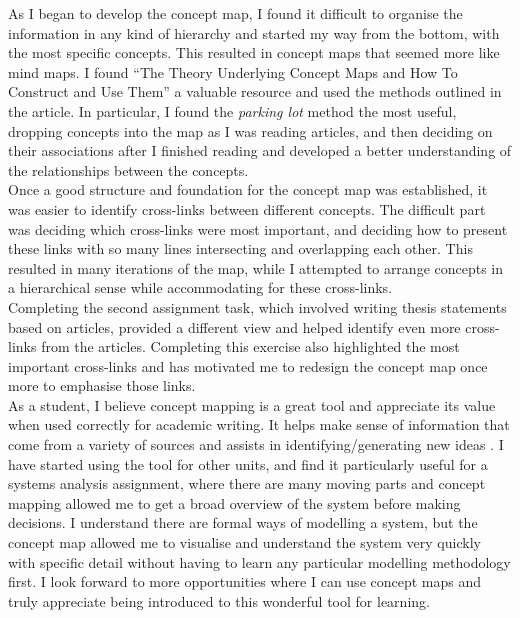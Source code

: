 \documentclass[12pt,a4paper]{report}
\begin{document}
As I began to develop the concept map, I found it difficult to organise the information in any kind of hierarchy and started my way from the bottom, with the most specific concepts. This resulted in concept maps that seemed more like mind maps. I found \citet{Novak2006} ``The Theory Underlying Concept Maps and How To Construct and Use Them'' a valuable resource and used the methods outlined in the article. In particular, I found the \emph{parking lot} method the most useful, dropping concepts into the map as I was reading articles, and then deciding on their associations after I finished reading and developed a better understanding of the relationships between the concepts.\\

Once a good structure and foundation for the concept map was established, it was easier to identify cross-links between different concepts. The difficult part was deciding which cross-links were most important, and deciding how to present these links with so many lines intersecting and overlapping each other. This resulted in many iterations of the map, while I attempted to arrange concepts in a hierarchical sense while accommodating for these cross-links.\\

Completing the second assignment task, which involved writing thesis statements based on articles, provided a different view and helped identify even more cross-links from the articles. Completing this exercise also highlighted the most important cross-links and has motivated me to redesign the concept map once more to emphasise those links.\\

As a student, I believe concept mapping is a great tool and appreciate its value when used correctly for academic writing. It helps make sense of information that come from a variety of sources and assists in identifying/generating new ideas \citep{Novak2006}. I have started using the tool for other units, and find it particularly useful for a systems analysis assignment, where there are many moving parts and concept mapping allowed me to get a broad overview of the system before making decisions. I understand there are formal ways of modelling a system, but the concept map allowed me to visualise and understand the system very quickly with specific detail without having to learn any particular modelling methodology first. I look forward to more opportunities where I can use concept maps and truly appreciate being introduced to this wonderful tool for learning.

\newpage
{}


\end{document}
